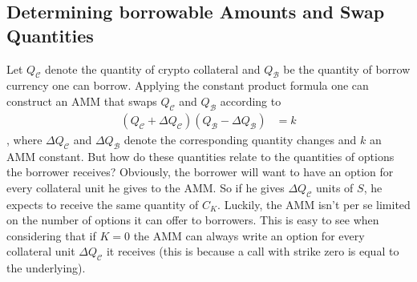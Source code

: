 \documentclass[a4paper]{article}
\begin{document}
\subsection{Determining borrowable Amounts and Swap Quantities}
\label{sec:determining_borrowable_amounts}

Let $Q_{\mathcal{C}}$ denote the quantity of crypto collateral and $Q_\mathcal{B}$ be the quantity of borrow currency one can borrow. Applying the constant product formula one can construct an AMM that swaps $Q_{\mathcal{C}}$ and $Q_\mathcal{B}$ according to
\begin{equation}
\begin{split}
(Q_\mathcal{C}+\Delta Q_\mathcal{C})(Q_\mathcal{B}-\Delta Q_\mathcal{B}) &= k
\end{split}
\end{equation}
, where $\Delta Q_\mathcal{C}$ and $\Delta Q_\mathcal{B}$ denote the corresponding quantity changes and $k$ an AMM constant. But how do these quantities relate to the quantities of options the borrower receives? Obviously, the borrower will want to have an option for every collateral unit he gives to the AMM. So if he gives $\Delta Q_{\mathcal{C}}$ units of $S$, he expects to receive the same quantity of $C_K$. Luckily, the AMM isn't per se limited on the number of options it can offer to borrowers. This is easy to see when considering that if $K=0$ the AMM can always write an option for every collateral unit $\Delta Q_{\mathcal{C}}$ it receives (this is because a call with strike zero is equal to the underlying).\\

\end{document}

